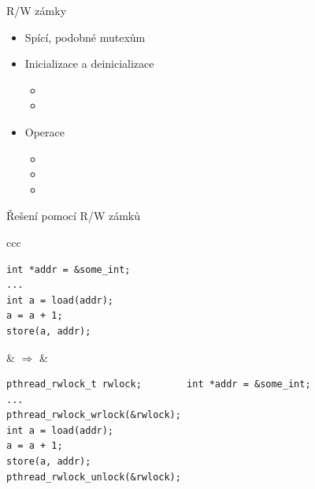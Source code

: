 \begin{frame}[fragile]{R/W zámky}

  \begin{itemize}
    \item Spící, podobné mutexům

    \pause

    \item Inicializace a deinicializace 
    \begin{itemize}
      \item {}
      \item {}
    \end{itemize}

    \pause

    \item Operace
    \begin{itemize}
      \item {}
      \item {}
      \item {}
    \end{itemize}

  \end{itemize}

  \pause

  \begin{block}{Řešení pomocí R/W zámků}
    \begin{center}
      \begin{tabular}{ccc}
	\begin{lstlisting}
int *addr = &some_int;
...
int a = load(addr);
a = a + 1;
store(a, addr);
	\end{lstlisting} & $\Rightarrow$ &
	\begin{lstlisting}[aboveskip=2pt,belowskip=2pt]
pthread_rwlock_t rwlock;        int *addr = &some_int;
...
pthread_rwlock_wrlock(&rwlock);
int a = load(addr);
a = a + 1;
store(a, addr);
pthread_rwlock_unlock(&rwlock);
	\end{lstlisting}
      \end{tabular}
    \end{center}
  \end{block}

\end{frame}

